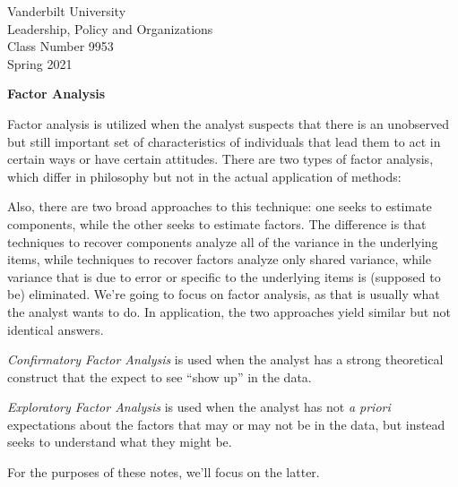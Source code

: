 \documentclass[12pt]{article}
\begin{document}
\thispagestyle{empty}%


\setlength{\parskip}{1ex plus 0.5ex minus 0.2ex}

\setcounter{secnumdepth}{-2}



\begin{flushleft}
Vanderbilt University\\Leadership, Policy and Organizations\\Class Number 9953\\ Spring 2021\\
\end{flushleft}

\begin{center}
\textbf{Factor Analysis}
\end{center}


Factor analysis is utilized when the analyst suspects  that there is
an unobserved but still important set of characteristics of
individuals that lead them to act in certain ways or have certain
attitudes. There are two types of factor analysis, which differ in
philosophy but not in the actual application of methods:

Also, there are two broad approaches to this technique: one seeks to
estimate components, while the other seeks to estimate factors. The
difference is that techniques to recover components analyze all of the
variance in the underlying items, while techniques to recover factors
analyze only shared variance, while variance that is due to error or
specific to the underlying items is (supposed to be) eliminated. We're
going to focus on factor analysis, as that is usually what the analyst
wants to do. In application, the two approaches yield similar but not
identical answers. 

\begin{description}

\item \emph{Confirmatory Factor Analysis} is used when the analyst
  has a strong theoretical construct that the expect to see ``show
  up'' in the data. 

\item \emph{Exploratory Factor Analysis} is used when the analyst has
  not \emph{a priori} expectations about the factors that may or may
  not be in the data, but instead seeks to understand what they might be.
\end{description}

For the purposes of these notes, we'll focus on the latter. 
\end{document}
